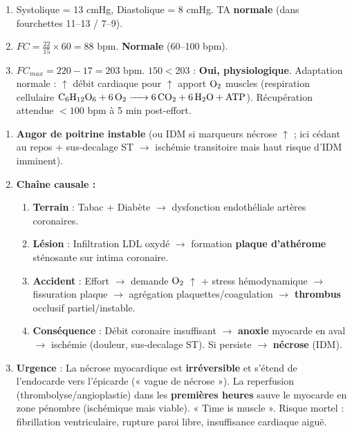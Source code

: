 \documentclass[11pt]{article}
\begin{document}
\begin{corrige}[Exercice 1]
\begin{enumerate}
\item Systolique = 13 cmHg, Diastolique = 8 cmHg. TA \textbf{normale} (dans fourchettes 11--13 / 7--9).
\item $FC = \frac{22}{15} \times 60 = 88$ bpm. \textbf{Normale} (60--100 bpm).
\item $FC_{max} = 220 - 17 = 203$ bpm. $150 < 203$ : \textbf{Oui, physiologique}. Adaptation normale : $\uparrow$ débit cardiaque pour $\uparrow$ apport $\ce{O2}$ muscles (respiration cellulaire $\ce{C6H12O6 + 6O2 -> 6CO2 + 6H2O + ATP}$). Récupération attendue $< 100$ bpm à 5 min post-effort.
\end{enumerate}
\end{corrige}

\begin{corrige}[Exercice 2]
\begin{enumerate}
\item \textbf{Angor de poitrine instable} (ou IDM si marqueurs nécrose $\uparrow$ ; ici cédant au repos + sus-decalage ST $\rightarrow$ ischémie transitoire mais haut risque d'IDM imminent).
\item \textbf{Chaîne causale :}
\begin{enumerate}
\item \textbf{Terrain} : Tabac + Diabète $\rightarrow$ dysfonction endothéliale artères coronaires.
\item \textbf{Lésion} : Infiltration LDL oxydé $\rightarrow$ formation \textbf{plaque d'athérome} sténosante sur intima coronaire.
\item \textbf{Accident} : Effort $\rightarrow$ demande $\ce{O2}$ $\uparrow$ + stress hémodynamique $\rightarrow$ fissuration plaque $\rightarrow$ agrégation plaquettes/coagulation $\rightarrow$ \textbf{thrombus} occlusif partiel/instable.
\item \textbf{Conséquence} : Débit coronaire insuffisant $\rightarrow$ \textbf{anoxie} myocarde en aval $\rightarrow$ ischémie (douleur, sus-decalage ST). Si persiste $\rightarrow$ \textbf{nécrose} (IDM).
\end{enumerate}
\item \textbf{Urgence} : La nécrose myocardique est \textbf{irréversible} et s'étend de l'endocarde vers l'épicarde (« vague de nécrose »). La reperfusion (thrombolyse/angioplastie) dans les \textbf{premières heures} sauve le myocarde en zone pénombre (ischémique mais viable). « Time is muscle ». Risque mortel : fibrillation ventriculaire, rupture paroi libre, insuffisance cardiaque aiguë.
\end{enumerate}
\end{corrige}
\end{document}
